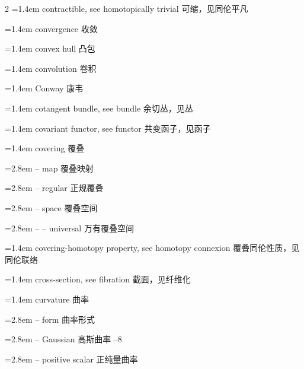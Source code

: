 \begin{multicols}{2}
\noindent\hangindent=1.4em contractible, see homotopically trivial \quad 可缩，见同伦平凡 \quad\par
\noindent\hangindent=1.4em convergence \quad 收敛 \par
\noindent\hangindent=1.4em convex hull \quad 凸包 \par
\noindent\hangindent=1.4em convolution \quad 卷积 \par
\noindent\hangindent=1.4em Conway \quad 康韦 \par
\noindent\hangindent=1.4em cotangent bundle, see bundle \quad 余切丛，见丛 \quad\par
\noindent\hangindent=1.4em covariant functor, see functor \quad 共变函子，见函子 \quad\par
\noindent\hangindent=1.4em covering \quad 覆叠 \quad\par
\noindent\hangindent=2.8em -- map \quad 覆叠映射 \par
\noindent\hangindent=2.8em -- regular \quad 正规覆叠 \par
\noindent\hangindent=2.8em -- space \quad 覆叠空间 \par
\noindent\hangindent=2.8em -- -- universal \quad 万有覆叠空间 \par
\noindent\hangindent=1.4em covering-homotopy property, see homotopy connexion \quad 覆叠同伦性质，见同伦联络 \quad\par
\noindent\hangindent=1.4em cross-section, see fibration \quad 截面，见纤维化 \quad\par
\noindent\hangindent=1.4em curvature \quad 曲率 \quad\par
\noindent\hangindent=2.8em -- form \quad 曲率形式 \par
\noindent\hangindent=2.8em -- Gaussian \quad 高斯曲率 --8\par
\noindent\hangindent=2.8em -- positive scalar \quad 正纯量曲率 \par
\end{multicols}


